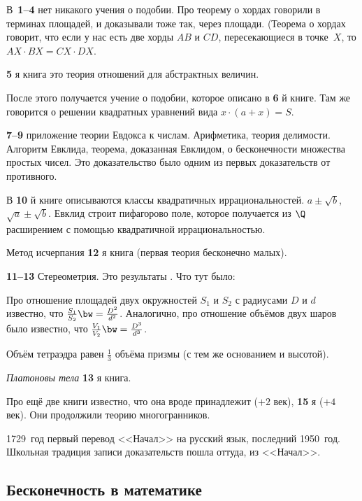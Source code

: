 \documentclass[a4paper,oneside,fleqn,10pt]{article}
\begin{document}
В~\textbf{1--4} нет никакого учения о подобии. Про теорему о хордах говорили
в терминах площадей, и доказывали тоже так, через площади.
(Теорема о хордах говорит, что если у нас есть две хорды $AB$ и $CD$, пересекающиеся в точке~$X$,
то $AX \cdot BX = CX \cdot DX$.

\textbf{5} я книга это теория отношений  для абстрактных величин.

После этого получается учение о подобии, которое описано в \textbf{6} й книге.
Там же говорится о решении квадратных уравнений вида $x \cdot (a + x) = S$.

\textbf{7--9} приложение теории Евдокса к числам. Арифметика, теория делимости.
Алгоритм Евклида, теорема, доказанная Евклидом, о бесконечности множества простых чисел.
Это доказательство было одним из первых доказательств от противного.

В \textbf{10} й книге описываются классы квадратичных иррациональностей.
$a \pm \sqrt b$, $\sqrt a \pm \sqrt b$. Евклид строит пифагорово поле,
которое получается из $\Q$ расширением с помощью квадратичной иррациональностью.

Метод исчерпания  \textbf{12} я книга (первая теория бесконечно малых).

\textbf{11--13} Стереометрия. Это результаты .
Что тут было:

Про отношение площадей двух окружностей $S_1$ и $S_2$ с радиусами $D$ и $d$ известно, что
$\frac{S_1}{S_2} \bw= \frac{D^2}{d^2}$.
Аналогично, про отношение объёмов двух шаров было известно, что $\frac{V_1}{V_2} \bw= \frac{D^3}{d^3}$.

Объём тетраэдра равен $\frac13$ объёма призмы (с тем же основанием и высотой).

\emph{Платоновы тела} \textbf{13} я книга.

Про ещё две книги известно, что она вроде принадлежит  ($+2$ век),
\textbf{15} я  ($+4$ век).
Они продолжили теорию многогранников.

1729~год первый перевод <<Начал>> на русский язык, последний 1950~год.
Школьная традиция записи доказательств пошла оттуда, из <<Начал>>.


\subsection{Бесконечность в математике}
\end{document}
